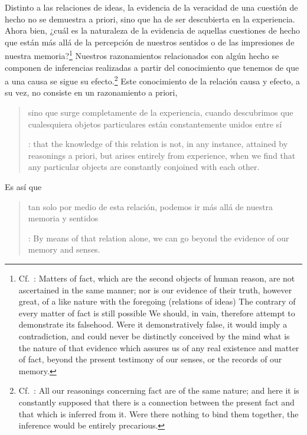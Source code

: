 Distinto a las relaciones de ideas, la evidencia de la veracidad de una cuestión
de hecho no se demuestra a priori, sino que ha de ser descubierta en la
experiencia. Ahora bien, ¿cuál es la naturaleza de la evidencia de aquellas
cuestiones de hecho que están más allá de la percepción de nuestros sentidos o
de las impresiones de nuestra memoria?\footnote{Cf.~\cite[\S4,1.
  15]{hume1777enquiry}: Matters of fact, which are the second objects of human
  reason, are not ascertained in the same manner; nor is our evidence of their
  truth, however great, of a like nature with the foregoing (relations of ideas)
  \textelp{} The contrary of every matter of fact is still possible \textelp{}
  We should, in vain, therefore attempt to demonstrate its falsehood. Were it
  demonstratively false, it would imply a contradiction, and could never be
  distinctly conceived by the mind \textelp{} what is the nature of that
  evidence which assures us of any real existence and matter of fact, beyond the
  present testimony of our senses, or the records of our memory.} Nuestros
razonamientos relacionados con algún hecho se componen de inferencias realizadas
a partir del conocimiento que tenemos de que a una causa se sigue su
efecto.\footnote{Cf.~\cite[\S4,1. 16]{hume1777enquiry}: All our reasonings
  concerning fact are of the same nature; and here it is constantly supposed
  that there is a connection between the present fact and that which is inferred
  from it. Were there nothing to bind them together, the inference would be
  entirely precarious.} Este conocimiento de la relación causa y efecto, a su
vez, no consiste en un razonamiento a priori, \blockquote[{\cite[\S4,1.
  17]{hume1777enquiry}}: that the knowledge of this relation is not, in any
instance, attained by reasonings a priori, but arises entirely from experience,
when we find that any particular objects are constantly conjoined with each
other.]{sino que surge completamente de la experiencia, cuando descubrimos que
  cualesquiera objetos particulares están constantemente unidos entre sí}. Es
así que \blockquote[{\cite[\S4,1. 16]{hume1777enquiry}}: By means of that
relation alone, we can go beyond the evidence of our memory and senses.]{tan
  solo por medio de esta relación, podemos ir más allá de nuestra memoria y
  sentidos}.

